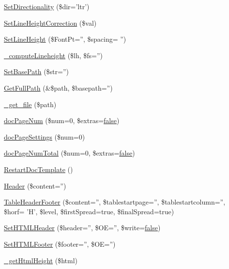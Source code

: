 \begin{DoxyCompactItemize}
\item 
\hyperlink{classm_p_d_f_a8fbbcab7227fb2849cb07aebc1623288}{Set\-Directionality} (\$dir='ltr')
\item 
\hyperlink{classm_p_d_f_a61eebb3f29a97ef9e92b2fc1fcd71f9f}{Set\-Line\-Height\-Correction} (\$val)
\item 
\hyperlink{classm_p_d_f_a0b80aaa2f5699352c9625f4433deb7ac}{Set\-Line\-Height} (\$Font\-Pt='', \$spacing= '')
\item 
\hyperlink{classm_p_d_f_a91dc6f9d8af635672c98aab3ed25784c}{\-\_\-compute\-Lineheight} (\$lh, \$fs='')
\item 
\hyperlink{classm_p_d_f_a7ebb66bfdcb9dd171bbde479b8913288}{Set\-Base\-Path} (\$str='')
\item 
\hyperlink{classm_p_d_f_a011af151752a300bb0b63243be82076f}{Get\-Full\-Path} (\&\$path, \$basepath='')
\item 
\hyperlink{classm_p_d_f_a782f3bebe02f67d87c011abb37f9e53e}{\-\_\-get\-\_\-file} (\$path)
\item 
\hyperlink{classm_p_d_f_a5c57936bb591c48b21789aa374c0d579}{doc\-Page\-Num} (\$num=0, \$extras=\hyperlink{ttfontsuni_8php_afbaa04e5cc97693dc668b3c45d3dd740}{false})
\item 
\hyperlink{classm_p_d_f_a7ff86b8ee55c19cc8c52163dcea66763}{doc\-Page\-Settings} (\$num=0)
\item 
\hyperlink{classm_p_d_f_acef8afda5b0e49152b0b00b741b72ff0}{doc\-Page\-Num\-Total} (\$num=0, \$extras=\hyperlink{ttfontsuni_8php_afbaa04e5cc97693dc668b3c45d3dd740}{false})
\item 
\hyperlink{classm_p_d_f_a8e5ec2f1ebbc49d6b8a344d480f4d316}{Restart\-Doc\-Template} ()
\item 
\hyperlink{classm_p_d_f_aa0f708c00ee427b6971a17746030d9ea}{Header} (\$content='')
\item 
\hyperlink{classm_p_d_f_ac001dc205f5a66c9f81943063501dd47}{Table\-Header\-Footer} (\$content='', \$tablestartpage='', \$tablestartcolumn='', \$horf= 'H', \$level, \$first\-Spread=true, \$final\-Spread=true)
\item 
\hyperlink{classm_p_d_f_a71a0320ceea676bbfe5978cd09625e84}{Set\-H\-T\-M\-L\-Header} (\$header='', \$O\-E='', \$write=\hyperlink{ttfontsuni_8php_afbaa04e5cc97693dc668b3c45d3dd740}{false})
\item 
\hyperlink{classm_p_d_f_a5f7554e74585ec5275f68269506cd88a}{Set\-H\-T\-M\-L\-Footer} (\$footer='', \$O\-E='')
\item 
\hyperlink{classm_p_d_f_ae21b1f730a6ed0cc602d75cf9c641902}{\-\_\-get\-Html\-Height} (\$html)

\end{DoxyCompactItemize}
